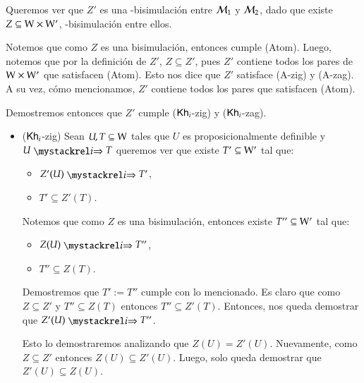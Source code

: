 \begin{demostracion}
    Queremos ver que $Z'$ es una \KHilogic-bisimulación entre $\mathcal{M}_1$ y $\mathcal{M}_2$,
    dado que existe $Z \subseteq \mathrm{W} \times \mathrm{W}'$, \KHilogic-bisimulación entre ellos.

    Notemos que como $Z$ es una bisimulación, entonces cumple (Atom). Luego, notemos que
    por la definición de $Z'$, $Z \subseteq Z'$, pues $Z'$ contiene todos los pares de
    $\mathrm{W} \times \mathrm{W}'$ que satisfacen (Atom). Esto nos dice que $Z'$ satisface (A-zig) y (A-zag).
    A su vez, cómo mencionamos, $Z'$ contiene todos los pares que satisfacen (Atom).

    Demostremos entonces que $Z'$ cumple ($\mathsf{Kh}_i$-zig) y ($\mathsf{Kh}_i$-zag).

    \begin{itemize}
        \item ($\mathsf{Kh}_i$-zig) Sean $U,T \subseteq \mathrm{W}$ tales que $U$ es proposicionalmente definible 
        y $U \ultsExecAgi T$ queremos ver que existe $T' \subseteq \mathrm{W}'$ tal que:
    
        \begin{multicols}{2}
            \begin{itemize}
                \item $Z'(U) \ultsExecAgi T'$, 
                \item $T' \subseteq Z'(T)$.
            \end{itemize}
        \end{multicols}
    
        Notemos que como $Z$ es una bisimulación, entonces existe $T'' \subseteq \mathrm{W}'$ tal que:
    
        \begin{multicols}{2}
            \begin{itemize}
                \item $Z(U) \ultsExecAgi T''$, 
                \item $T'' \subseteq Z(T)$.
            \end{itemize}
        \end{multicols}
    
        Demostremos que $T' := T''$ cumple con lo mencionado. Es claro que como $Z \subseteq Z'$ y 
        $T'' \subseteq Z(T)$ entonces $T'' \subseteq Z'(T)$. Entonces, nos queda demostrar que $Z'(U) \ultsExecAgi T''$.
    
        Esto lo demostraremos analizando que $Z(U) = Z'(U)$. Nuevamente, como $Z \subseteq Z'$
        entonces $Z(U) \subseteq Z'(U)$. Luego, solo queda demostrar que $Z'(U) \subseteq Z(U)$.
    

\end{itemize}
\end{demostracion}
